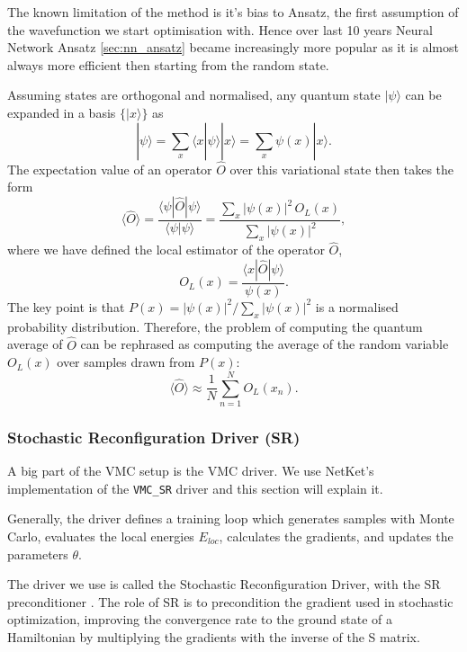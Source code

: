 \documentclass[a4paper,11pt,twoside]{article}
\begin{document}
The known limitation of the method is it's bias to Ansatz, the first assumption of the wavefunction we start optimisation with.
Hence over last 10 years Neural Network Ansatz \ref{sec:nn_ansatz} became increasingly more popular as it is almost always more efficient then starting from the random state.  

Assuming states are orthogonal and normalised, any quantum state $|\psi\rangle$ can be expanded in a basis $\{|x\rangle\}$ as
\begin{equation}
    |\psi\rangle = \sum_x \langle x|\psi\rangle |x\rangle = \sum_x \psi(x)|x\rangle.
\end{equation}
The expectation value of an operator $\hat O$ over this variational state then takes the form
\begin{equation}
    \langle \hat O \rangle = \frac{\langle\psi|\hat O|\psi\rangle}{\langle\psi|\psi\rangle}
    = \frac{\sum_x |\psi(x)|^2 \, O_L(x)}{\sum_x |\psi(x)|^2},
\end{equation}
where we have defined the local estimator of the operator $\hat O$,
\begin{equation}
    O_L(x) = \frac{\langle x|\hat O|\psi\rangle}{\psi(x)}.
\end{equation}
The key point is that $P(x) = |\psi(x)|^2 / \sum_x |\psi(x)|^2$ is a normalised probability distribution. Therefore, the problem of computing the quantum average of $\hat O$ can be rephrased as computing the average of the random variable $O_L(x)$ over samples drawn from $P(x)$:
\begin{equation}
    \langle \hat O \rangle \approx \frac{1}{N}\sum_{n=1}^N O_L(x_n).
\end{equation}

\subsubsection{Stochastic Reconfiguration Driver (SR)}
\label{sec:SR}

A big part of the VMC setup is the VMC driver. We use NetKet's implementation of the \texttt{VMC\_SR} driver and this section will explain it.

Generally, the driver defines a training loop which generates samples with Monte Carlo, evaluates the local energies $E_{loc}$, calculates the gradients, and updates the parameters $\theta$.

The driver we use is called the Stochastic Reconfiguration Driver, with the SR preconditioner \cite{rende_simple_2024, becca_quantum_2017}. The role of SR is to precondition the gradient used in stochastic optimization, improving the convergence rate to the ground state of a Hamiltonian by multiplying the gradients with the inverse of the S matrix.
\end{document}
